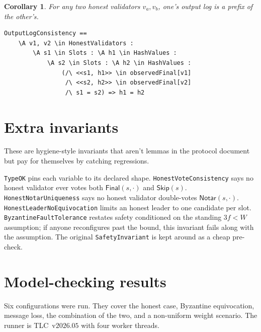 \documentclass[11pt,a4paper]{article}
\newcommand{\Notar}{\mathsf{Notar}}
\newcommand{\Skip}{\mathsf{Skip}}
\newcommand{\Final}{\mathsf{Final}}
\newtheorem{corollary}[lemma]{Corollary}
\begin{document}
\begin{corollary}
For any two honest validators $v_a, v_b$, one's output log is a
prefix of the other's.
\end{corollary}

\begin{lstlisting}
OutputLogConsistency ==
    \A v1, v2 \in HonestValidators :
        \A s1 \in Slots : \A h1 \in HashValues :
            \A s2 \in Slots : \A h2 \in HashValues :
                (/\ <<s1, h1>> \in observedFinal[v1]
                 /\ <<s2, h2>> \in observedFinal[v2]
                 /\ s1 = s2) => h1 = h2
\end{lstlisting}

\section{Extra invariants}

These are hygiene-style invariants that aren't lemmas in the protocol
document but pay for themselves by catching regressions.

\verb|TypeOK| pins each variable to its declared shape.
\verb|HonestVoteConsistency| says no honest validator ever votes both
$\Final(s,\cdot)$ and $\Skip(s)$.
\verb|HonestNotarUniqueness| says no honest validator double-votes
$\Notar(s,\cdot)$.
\verb|HonestLeaderNoEquivocation| limits an honest leader to one
candidate per slot.
\verb|ByzantineFaultTolerance| restates safety conditioned on the
standing $3f<W$ assumption; if anyone reconfigures past the bound, this
invariant fails along with the assumption.
The original \verb|SafetyInvariant| is kept around as a cheap
pre-check.

\section{Model-checking results}\label{sec:tlc}

Six configurations were run. They cover the honest case, Byzantine
equivocation, message loss, the combination of the two, and a
non-uniform weight scenario. The runner is TLC~v$2026.05$ with four
worker threads.
\end{document}
